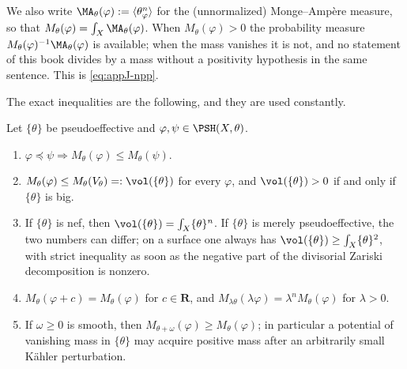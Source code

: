 We also write \(\MA_\theta(\varphi):=\langle\theta_\varphi^n\rangle\) for
the (unnormalized) Monge--Amp\`ere measure, so that
\(M_\theta(\varphi)=\int_X\MA_\theta(\varphi)\).  When
\(M_\theta(\varphi)>0\) the probability measure
\(M_\theta(\varphi)^{-1}\MA_\theta(\varphi)\) is available; when the mass
vanishes it is not, and no statement of this book divides by a mass
without a positivity hypothesis in the same sentence.  This is
\eqref{eq:appJ-npp}.

The exact inequalities are the following, and they are used constantly.

\begin{proposition}\label{prop:ch51-mass-inequalities}
Let \(\{\theta\}\) be pseudoeffective and \(\varphi,\psi\in
\PSH(X,\theta)\).
\begin{enumerate}
\item\label{itm:ch51-mi:monotone}
      \(\varphi\preceq\psi\Rightarrow
      M_\theta(\varphi)\leq M_\theta(\psi)\).
\item\label{itm:ch51-mi:minimal}
      \(M_\theta(\varphi)\leq M_\theta(V_\theta)=:\vol(\{\theta\})\) for
      every \(\varphi\), and \(\vol(\{\theta\})>0\) if and only if
      \(\{\theta\}\) is big.
\item\label{itm:ch51-mi:nef}
      If \(\{\theta\}\) is nef, then
      \(\vol(\{\theta\})=\int_X\{\theta\}^n\).  If \(\{\theta\}\) is
      merely pseudoeffective, the two numbers can differ; on a surface one
      always has \(\vol(\{\theta\})\geq\int_X\{\theta\}^2\), with strict
      inequality as soon as the negative part of the divisorial Zariski
      decomposition is nonzero.
\item\label{itm:ch51-mi:translation}
      \(M_\theta(\varphi+c)=M_\theta(\varphi)\) for \(c\in\mathbf R\), and
      \(M_{\lambda\theta}(\lambda\varphi)=\lambda^nM_\theta(\varphi)\) for
      \(\lambda>0\).
\item\label{itm:ch51-mi:perturb}
      If \(\omega\geq0\) is smooth, then
      \(M_{\theta+\omega}(\varphi)\geq M_\theta(\varphi)\); in particular
      a potential of vanishing mass in \(\{\theta\}\) may acquire positive
      mass after an arbitrarily small K\"ahler perturbation.
\end{enumerate}
\end{proposition}

